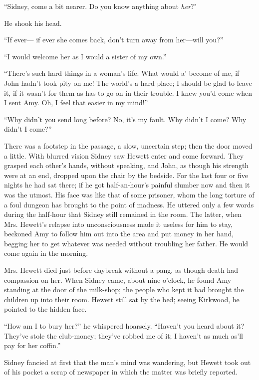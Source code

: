 ``Sidney, come a bit nearer. Do you know anything about \emph{her}?"

He shook his head.

``If ever--- if ever she comes back, don't turn away from her---will
you?''

``I would welcome her as I would a sister of my own.''

``There's such hard things in a woman's life. What would a' become of
me, if John hadn't took pity on me! The world's a hard place; I should
be glad to leave it, if it wasn't for them as has to go on in their
trouble. I knew you'd come when I sent Amy. Oh, I feel that easier in my
mind!''

``Why didn't you send long before? No,
{\protect\hypertarget{170}{}{}}it's my fault. Why didn't I come? Why
didn't I come?''

There was a footstep in the passage, a slow, uncertain step; then the
door moved a little. With blurred vision Sidney saw Hewett enter and
come forward. They grasped each other's hands, without speaking, and
John, as though his strength were at an end, dropped upon the chair by
the bedside. For the last four or five nights he had sat there; if he
got half-an-hour's painful slumber now and then it was the utmost. His
face was like that of some prisoner, whom the long torture of a foul
dungeon has brought to the point of madness. He uttered only a few words
during the half-hour that Sidney still remained in the room. The latter,
when Mrs. Hewett's relapse into unconsciousness made it useless for him
to stay, beckoned Amy to follow him out into the area and put money in
her hand, begging her to get whatever was needed without troubling her
father. He would come again in the morning.

Mrs. Hewett died just before daybreak
{\protect\hypertarget{171}{}{}}without a pang, as though death had
compassion on her. When Sidney came, about nine o'clock, he found Amy
standing at the door of the milk-shop; the people who kept it had
brought the children up into their room. Hewett still sat by the bed;
seeing Kirkwood, he pointed to the hidden face.

``How am I to bury her?'' he whispered hoarsely. ``Haven't you heard
about it? They've stole the club-money; they've robbed me of it; I
haven't as much as'll pay for her coffin.''

Sidney fancied at first that the man's mind was wandering, but Hewett
took out of his pocket a scrap of newspaper in which the matter was
briefly reported.

